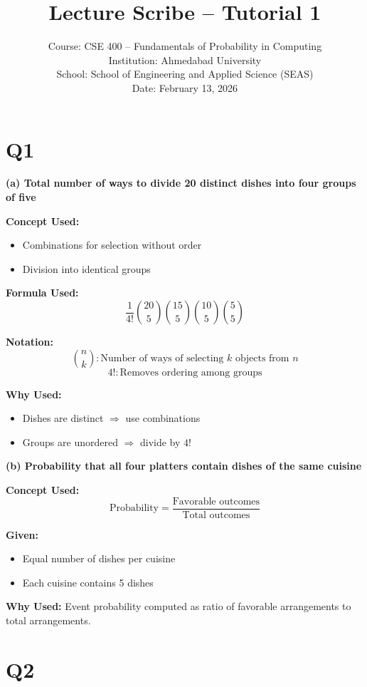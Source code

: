 \documentclass[12pt]{article}
\title{\textbf{Lecture Scribe -- Tutorial 1}}
\author{
Course: CSE 400 -- Fundamentals of Probability in Computing\\
Institution: Ahmedabad University\\
School: School of Engineering and Applied Science (SEAS)\\
Date: February 13, 2026
}
\date{}
\begin{document}
\maketitle
\thispagestyle{empty}

\section*{Q1}

\textbf{(a) Total number of ways to divide 20 distinct dishes into four groups of five}

\textbf{Concept Used:}
\begin{itemize}
    \item Combinations for selection without order
    \item Division into identical groups
\end{itemize}

\textbf{Formula Used:}
\[
\frac{1}{4!}
\binom{20}{5}
\binom{15}{5}
\binom{10}{5}
\binom{5}{5}
\]

\textbf{Notation:}
\[
\binom{n}{k} : \text{Number of ways of selecting } k \text{ objects from } n
\]
\[
4! : \text{Removes ordering among groups}
\]

\textbf{Why Used:}
\begin{itemize}
    \item Dishes are distinct $\Rightarrow$ use combinations
    \item Groups are unordered $\Rightarrow$ divide by $4!$
\end{itemize}

\vspace{0.3cm}

\textbf{(b) Probability that all four platters contain dishes of the same cuisine}

\textbf{Concept Used:}
\[
\text{Probability} = \frac{\text{Favorable outcomes}}{\text{Total outcomes}}
\]

\textbf{Given:}
\begin{itemize}
    \item Equal number of dishes per cuisine
    \item Each cuisine contains 5 dishes
\end{itemize}

\textbf{Why Used:} Event probability computed as ratio of favorable arrangements to total arrangements.

\section*{Q2}
\end{document}
